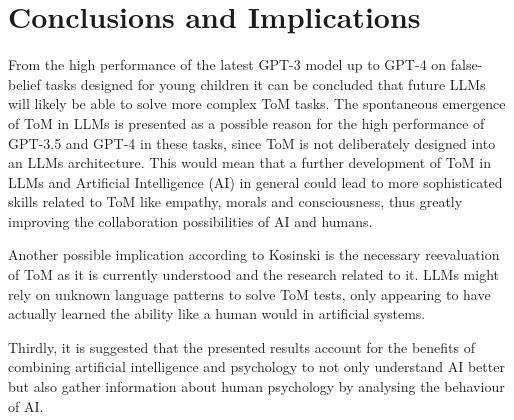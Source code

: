 \section{Conclusions and Implications}
From the high performance of the latest GPT-3 model up to GPT-4 on false-belief tasks designed for young children it can be concluded that future LLMs will likely be able to solve more complex ToM tasks. The spontaneous emergence of ToM in LLMs is presented as a possible reason for the high performance of GPT-3.5 and GPT-4 in these tasks, since ToM is not deliberately designed into an LLMs architecture. This would mean that a further development of ToM in LLMs and Artificial Intelligence (AI) in general could lead to more sophisticated skills related to ToM like empathy, morals and consciousness, thus greatly improving the collaboration possibilities of AI and humans. \cite{kosinski}

Another possible implication according to Kosinski is the necessary reevaluation of ToM as it is currently understood and the research related to it. LLMs might rely on unknown language patterns to solve ToM tests, only appearing to have actually learned the ability like a human would in artificial systems.\cite{kosinski}

Thirdly, it is suggested that the presented results account for the benefits of combining artificial intelligence and psychology to not only understand AI better but also gather information about human psychology by analysing the behaviour of AI. \cite{kosinski}